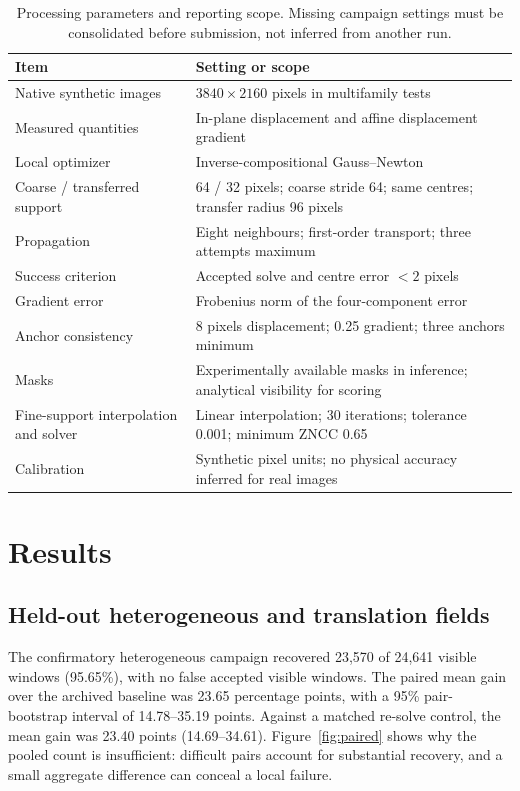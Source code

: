 \documentclass[11pt,a4paper]{article}
\begin{document}
\begin{table}[tb]\centering\caption{Processing parameters and reporting scope. Missing campaign settings must be consolidated before submission, not inferred from another run.}\small
\begin{tabular}{p{.35\linewidth}p{.57\linewidth}}\toprule Item & Setting or scope\\\midrule
Native synthetic images & $3840\times2160$ pixels in multifamily tests\\
Measured quantities & In-plane displacement and affine displacement gradient\\
Local optimizer & Inverse-compositional Gauss--Newton\\
Coarse / transferred support & 64 / 32 pixels; coarse stride 64; same centres; transfer radius 96 pixels\\
Propagation & Eight neighbours; first-order transport; three attempts maximum\\
Success criterion & Accepted solve and centre error $<2$ pixels\\
Gradient error & Frobenius norm of the four-component error\\
Anchor consistency & 8 pixels displacement; 0.25 gradient; three anchors minimum\\
Masks & Experimentally available masks in inference; analytical visibility for scoring\\
Fine-support interpolation and solver & Linear interpolation; 30 iterations; tolerance 0.001; minimum ZNCC 0.65\\
Calibration & Synthetic pixel units; no physical accuracy inferred for real images\\\bottomrule
\end{tabular}\end{table}

\section{Results}

\subsection{Held-out heterogeneous and translation fields}
The confirmatory heterogeneous campaign recovered 23,570 of 24,641 visible windows (95.65\%), with no false accepted visible windows. The paired mean gain over the archived baseline was 23.65 percentage points, with a 95\% pair-bootstrap interval of 14.78--35.19 points. Against a matched re-solve control, the mean gain was 23.40 points (14.69--34.61). Figure~\ref{fig:paired} shows why the pooled count is insufficient: difficult pairs account for substantial recovery, and a small aggregate difference can conceal a local failure.
\end{document}
